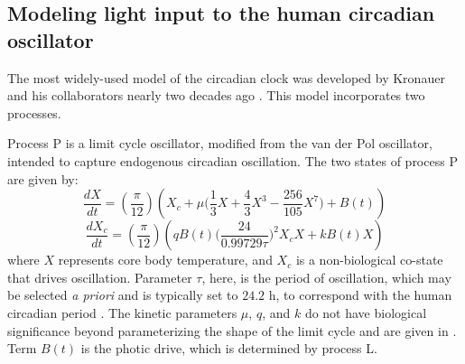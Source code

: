 \subsection*{Modeling light input to the human circadian oscillator}

The most widely-used model of the circadian clock was developed by Kronauer and his collaborators nearly two decades ago \cite{Jewett1998,Kronauer1999}.
This model incorporates two processes.


Process P is a limit cycle oscillator, modified from the van der Pol oscillator, intended to capture endogenous circadian oscillation.
The two states of process P are given by:
\begin{equation}
    \frac{dX}{dt} = \left(\frac{\pi}{12}\right)\left(X_c + \mu \bigg(\frac{1}{3}X + \frac{4}{3}X^3 - \frac{256}{105}X^7\bigg) +B(t)\right) 
\end{equation}
\begin{equation}
    \frac{dX_c}{dt} =\left(\frac{\pi}{12}\right)\left(qB(t)\bigg(\frac{24}{0.99729\tau}\bigg)^2 X_c X + kB(t)X\right)
\end{equation}
where $X$ represents core body temperature, and $X_c$ is a non-biological co-state that drives oscillation.
Parameter $\tau$, here, is the period of oscillation, which may be selected \textit{a priori} and is typically set to $24.2$ h, to correspond with the human circadian period \cite{Czeisler1999}.
The kinetic parameters $\mu$, $q$, and $k$ do not have biological significance beyond parameterizing the shape of the limit cycle and are given in \cite{Kronauer1999}.
Term $B(t)$ is the photic drive, which is determined by process L.

